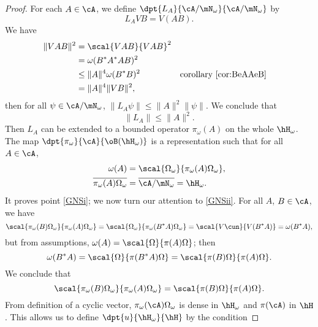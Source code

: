 \begin{proof}
For each $A\in\cA$, we define $\dpt{L_A}{\cA/\mN_{\omega}}{\cA/\mN_{\omega}}$ by
\begin{equation}  \label{eq:defpiomega}
L_AVB=V(AB). 
\end{equation}
We have
\begin{equation}
\begin{aligned}
\| VAB \|^2&=\scal{VAB}{VAB}^2\\
        &=\omega(B^*A^*AB)^2\\
        &\leq \| A \|^4\omega(B^*B)^2&&\textrm{corollary \ref{cor:BeAAeB}}\\
        &=\| A \|^4\| VB \|^2,
\end{aligned}
\end{equation}
then for all $\psi\in\cA/\mN_{\omega}$, $\| L_A\psi \|\leq \| A \|^2\| \psi \|$. We conclude that
\begin{equation}
  \| L_A \|\leq \| A \|^2.
\end{equation}
Then $L_A$ can be extended to a bounded operator $\pi_{\omega}(A)$ on the whole $\hH_{\omega}$. The map $\dpt{\pi_{\omega}}{\cA}{\oB(\hH_{\omega})}$ is a representation such that for all $A\in\cA$,
\begin{subequations}
\begin{align}
\omega(A)&=\scal{\Omega_{\omega}}{\pi_{\omega}(A)\Omega_{\omega}},\\
\overline{ \pi_{\omega}(A)\Omega_{\omega} }&=\overline{ \cA/\mN_{\omega} }=\hH_{\omega}.
\end{align}
\end{subequations}
It proves point \ref{GNSi}; we now turn our attention to \ref{GNSii}. For all $A$, $B\in\cA$, we have
\begin{equation}  \label{eq_r1903r4}
\scal{\pi_{\omega}(B)\Omega_{\omega}}{\pi_{\omega}(A)\Omega_{\omega}}=\scal{\Omega_{\omega}}{\pi_{\omega}(B^*A)\Omega_{\omega}}
        =\scal{V\cun}{V(B^*A)}
        =\omega(B^*A),
\end{equation}
but from assumptions, $\omega(A)=\scal{\Omega}{\pi(A)\Omega}$; then 
\begin{equation} \label{eq:BesAOmBeA}
  \omega(B^*A)=\scal{\Omega}{\pi(B^*A)\Omega}
        =\scal{\pi(B)\Omega}{\pi(A)\Omega}.
\end{equation}
We conclude that 
\begin{equation}
  \scal{\pi_{\omega}(B)\Omega_{\omega}}{\pi_{\omega}(A)\Omega_{\omega}}=
    \scal{\pi(B)\Omega}{\pi(A)\Omega}.
\end{equation}
From definition of a cyclic vector, $\pi_{\omega}(\cA)\Omega_{\omega}$ is dense in $\hH_{\omega}$ and $\pi(\cA)$ in $\hH$. This allows us to define $\dpt{u}{\hH_{\omega}}{\hH}$ by the condition

\end{proof}
